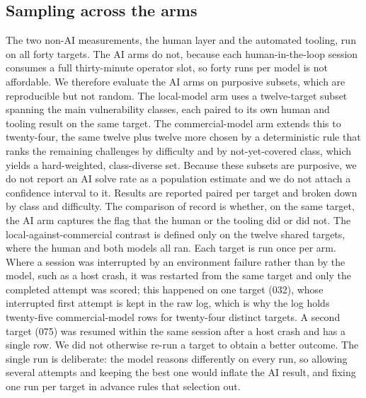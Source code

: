 \documentclass[conference]{IEEEtran}
\begin{document}
\subsection{Sampling across the arms}
The two non-AI measurements, the human layer and the automated tooling, run on all forty targets. The AI arms do not, because each human-in-the-loop session consumes a full thirty-minute operator slot, so forty runs per model is not affordable. We therefore evaluate the AI arms on purposive subsets, which are reproducible but not random. The local-model arm uses a twelve-target subset spanning the main vulnerability classes, each paired to its own human and tooling result on the same target. The commercial-model arm extends this to twenty-four, the same twelve plus twelve more chosen by a deterministic rule that ranks the remaining challenges by difficulty and by not-yet-covered class, which yields a hard-weighted, class-diverse set. Because these subsets are purposive, we do not report an AI solve rate as a population estimate and we do not attach a confidence interval to it. Results are reported paired per target and broken down by class and difficulty. The comparison of record is whether, on the same target, the AI arm captures the flag that the human or the tooling did or did not. The local-against-commercial contrast is defined only on the twelve shared targets, where the human and both models all ran. Each target is run once per arm. Where a session was interrupted by an environment failure rather than by the model, such as a host crash, it was restarted from the same target and only the completed attempt was scored; this happened on one target (032), whose interrupted first attempt is kept in the raw log, which is why the log holds twenty-five commercial-model rows for twenty-four distinct targets. A second target (075) was resumed within the same session after a host crash and has a single row. We did not otherwise re-run a target to obtain a better outcome. The single run is deliberate: the model reasons differently on every run, so allowing several attempts and keeping the best one would inflate the AI result, and fixing one run per target in advance rules that selection out.
\end{document}
